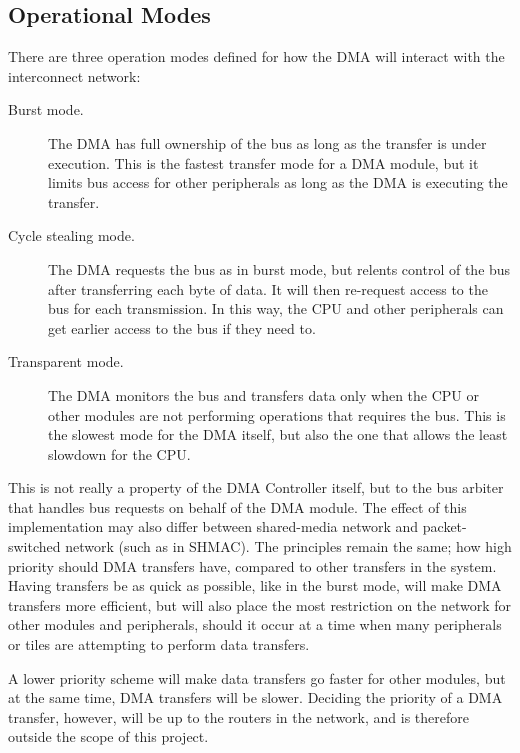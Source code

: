 \subsection{Operational Modes}
There are three operation modes defined for how the DMA will interact with the interconnect network:
\begin{description}
    \item[Burst mode.] 
    The DMA has full ownership of the bus as long as the transfer is under execution.
    This is the fastest transfer mode for a DMA module, but it limits bus access for other
    peripherals as long as the DMA is executing the transfer. \cite{encyclopedia}

    \item[Cycle stealing mode.] 
    The DMA requests the bus as in burst mode, but relents control of the bus after transferring
    each byte of data. It will then re-request access to the bus for each transmission.
    In this way, the CPU and other peripherals can get earlier access to the bus if they need to. \cite{encyclopedia}

    \item[Transparent mode.] 
    The DMA monitors the bus and transfers data only when the CPU or other modules are not performing operations that requires the bus.
    This is the slowest mode for the DMA itself, but also the one that allows the least slowdown for the CPU. \cite{dma-lecture}
\end{description}

This is not really a property of the DMA Controller itself, but to the bus arbiter that handles bus requests on behalf of the DMA module.
The effect of this implementation may also differ between shared-media network and packet-switched network (such as in SHMAC).
The principles remain the same; how high priority should DMA transfers have, compared to other transfers in the system. 
Having transfers be as quick as possible, like in the burst mode, will make DMA transfers more efficient, but will also place the most restriction on the network for other modules and peripherals, should it occur at a time when many peripherals or tiles are attempting to perform data transfers.

A lower priority scheme will make data transfers go faster for other modules, but at
the same time, DMA transfers will be slower. Deciding the priority of a DMA transfer,
however, will be up to the routers in the network,  and is therefore outside the scope of this project.

